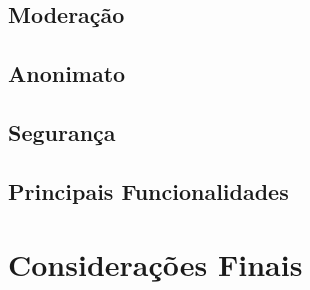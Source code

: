 \documentclass[12pt, a4paper]{report}
\begin{document}
\section{ Moderação}
\section{ Anonimato}
\section{ Segurança}
\section{ Principais Funcionalidades}

\chapter{Considerações Finais}


\renewcommand\bibname{Referências}


\nocite{*}

\appendix
\end{document}
